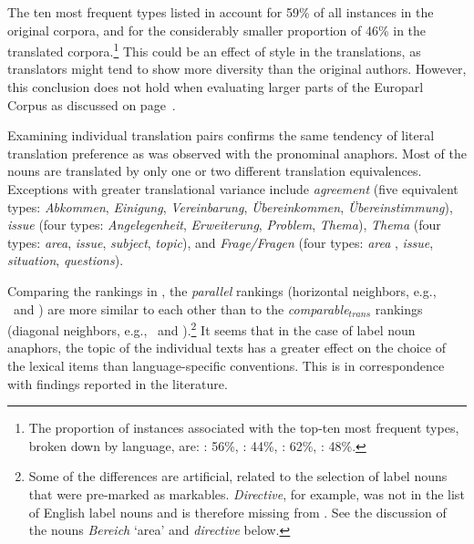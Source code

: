 \documentclass[output=paper]{LSP/langsci}
\begin{document}
The ten most frequent types listed in  account for 59\% of all instances in the original corpora, and for the considerably smaller proportion of 46\% in the translated corpora.\footnote{The proportion of instances associated with the top-ten most frequent types, broken down by language, are: \DEo: 56\%, \ENt:  44\%, \ENo: 62\%, \DEt: 48\%.} This could be an effect of style in the translations, as translators might tend to show more diversity than the original authors. However, this conclusion does not hold when evaluating larger parts of the Europarl Corpus as discussed on page~\pageref{conclusion}.

Examining individual translation pairs confirms the same tendency of literal translation preference  as was observed with the pronominal anaphors. Most of the nouns are translated by only one or two different translation equivalences. Exceptions with greater translational variance include \textit{agreement} (five equivalent types: \textit{Abkommen}, \textit{Einigung}, \textit{Vereinbarung},  \textit{\"Ubereinkommen}, \textit{\"Ubereinstimmung}), \textit{issue} (four types: \textit{Angelegenheit},   \textit{Erweiterung}, \textit{Problem},         \textit{Thema}), \textit{Thema} (four types:   \textit{area},   \textit{issue}, \textit{subject},   \textit{topic}),  and \textit{Frage/Fragen} (four types: \textit{area} ,    \textit{issue}, \textit{situation}, \textit{questions}). %


Comparing the rankings  in , the \textit{parallel} rankings  (horizontal neighbors, e.g., \DEo\ and \ENt) are more similar to each other than to the \textit{comparable$_{trans}$}  rankings (diagonal neighbors, e.g., \DEo\ and \DEt).\footnote{Some of the differences are artificial, related to the selection of label nouns that were pre-marked as markables. \textit{Directive}, for example, was not in the list of English label nouns and is therefore missing from \ENo. See the discussion of the nouns \textit{Bereich} `area' and \textit {directive} below.} It seems that in the case of label noun anaphors, the topic of the individual texts has a greater effect on the choice of the lexical items than language-specific conventions. This is in correspondence with findings reported in the literature. %

\end{document}

